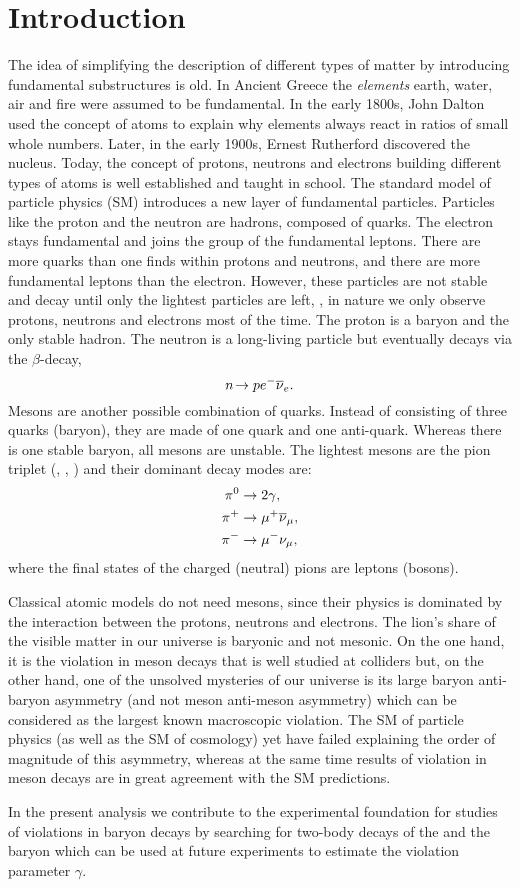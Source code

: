 \chapter*{Introduction}
The idea of simplifying the description of different types of matter by introducing fundamental substructures is old.
In Ancient Greece the \textit{elements} earth, water, air and fire were assumed to be fundamental.
In the early 1800s, John Dalton used the concept of atoms to explain why elements always react in ratios of small whole numbers.
Later, in the early 1900s, Ernest Rutherford discovered the nucleus.
Today, the concept of protons, neutrons and electrons building different types of atoms is well established and taught in school.
The standard model of particle physics (SM) introduces a new layer of fundamental particles.
Particles like the proton and the neutron are hadrons, composed of quarks.
The electron stays fundamental and joins the group of the fundamental leptons.
There are more quarks than one finds within protons and neutrons, and there are more fundamental leptons than the electron.
However, these particles are not stable and decay until only the lightest particles are left, \ie{}, in nature we only observe protons, neutrons and electrons most of the time.
The proton is a baryon and the only stable hadron.
The neutron is a long-living particle but eventually decays via the $\beta$-decay,
\begin{equation*}
    {\ensuremath{n}}\!\rightarrow {\ensuremath{p}}{\ensuremath{e^-}}{\ensuremath{{\overline{\nu}}_e}}.
\end{equation*}
Mesons are another possible combination of quarks.
Instead of consisting of three quarks (baryon), they are made of one quark and one anti-quark.
Whereas there is one stable baryon, all mesons are unstable.
The lightest mesons are the pion triplet (\pip, \piz, \pim) and their dominant decay modes are:
\begin{align*}
    {\ensuremath{{\pi}^0}} &\rightarrow 2\gamma, \\
    {{\pi}^+} &\rightarrow {\ensuremath{\mu^+}} {\ensuremath{{\overline{\nu}}_\mu}}, \\
    {{\pi}^-} &\rightarrow {\ensuremath{\mu^-}} {\ensuremath{{\nu}_\mu}},
\end{align*}
where the final states of the charged (neutral) pions are leptons (bosons).

Classical atomic models do not need mesons, since their physics is dominated by the interaction between the protons, neutrons and electrons.
The lion's share of the visible matter in our universe is baryonic and not mesonic.
On the one hand, it is the \CP violation in meson decays that is well studied at colliders but, on the other hand, one of the unsolved mysteries of our universe is its large baryon anti-baryon asymmetry (and not meson anti-meson asymmetry) which can be considered as the largest known macroscopic \CP violation.
The SM of particle physics (as well as the SM of cosmology) yet have failed explaining the order of magnitude of this asymmetry, whereas at the same time results of \CP violation in meson decays are in great agreement with the SM predictions.

In the present analysis we contribute to the experimental foundation for studies of \CP violations in baryon decays by searching for two-body decays of the \Lb and the \Xibz baryon which can be used at future experiments to estimate the \CP violation parameter $\gamma$.

